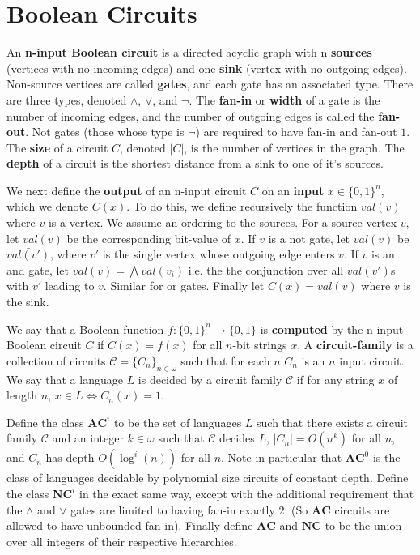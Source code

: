 \section{Boolean Circuits}
\begin{definition}
	An \textbf{n-input Boolean circuit} is a directed acyclic graph with n \textbf{sources} (vertices with no incoming edges) and one \textbf{sink} (vertex with no outgoing edges). Non-source vertices are called \textbf{gates}, and each gate has an associated type. There are three types, denoted $\wedge$, $\vee$, and $\neg$. The \textbf{fan-in} or \textbf{width} of a gate is the number of incoming edges, and the number of outgoing edges is called the \textbf{fan-out}. Not gates (those whose type is $\neg$) are required to have fan-in and fan-out $1$. The \textbf{size} of a circuit $C$, denoted $|C|$, is the number of vertices in the graph. The \textbf{depth} of a circuit is the shortest distance from a sink to one of it's sources. \par 
	We next define the \textbf{output} of an  n-input circuit $C$ on an \textbf{input} $x \in \{0,1\}^n$, which we denote $C(x)$. To do this, we define recursively the function $val(v)$ where $v$ is a vertex. We assume an ordering to the sources. For a source vertex $v$, let $val(v)$ be the corresponding bit-value of $x$. If $v$ is a not gate, let $val(v)$ be $\bar{val(v')}$, where $v'$ is the single vertex whose outgoing edge enters $v$. If $v$ is an and gate, let $val(v) = \bigwedge val(v_i)$ i.e. the the conjunction over all $val(v')$s with $v'$ leading to $v$. Similar for or gates. Finally let $C(x) = val(v)$ where $v$ is the sink. \par 
	We say that a Boolean function $f:\{0,1\}^n \to \{0,1\}$ is \textbf{computed} by the n-input Boolean circuit $C$ if $C(x) = f(x)$ for all $n$-bit strings $x$. A \textbf{circuit-family} is a collection of circuits $\mathcal{C} = \{C_n\}_{n \in \omega}$ such that for each $n$ $C_n$ is an $n$ input circuit. We say that a language $L$ is decided by a circuit family $\mathcal{C}$ if for any string $x$ of length $n$, $x \in L \iff C_n(x) = 1$. \par 
	Define the class $\bm{AC}^i$ to be the set of languages $L$ such that there exists a circuit family $\mathcal{C}$ and an integer $k \in \omega$ such that $\mathcal{C}$ decides $L$, $|C_n| = O(n^k)$ for all $n$, and $C_n$ has depth $O(\log^i(n))$ for all $n$. Note in particular that $\bm{AC}^0$ is the class of languages decidable by polynomial size circuits of constant depth. Define the class $\bm{NC}^i$ in the exact same way, except with the additional requirement that the $\wedge$ and $\vee$ gates are limited to having fan-in exactly $2$. (So $\bm{AC}$ circuits are allowed to have unbounded fan-in). Finally define $\bm{AC}$ and $\bm{NC}$ to be the union over all integers of their respective hierarchies. 
\end{definition}
